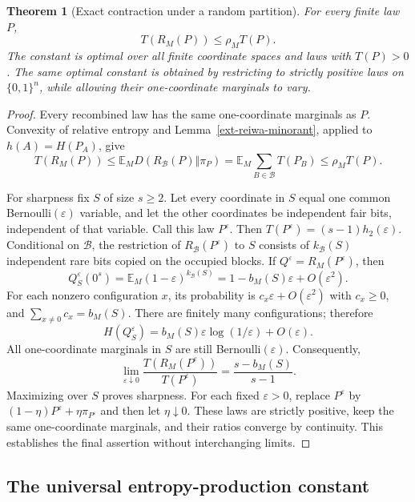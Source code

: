\documentclass[11pt,a4paper]{article}
\newtheorem{theorem}{Theorem}[section]
\theoremstyle{definition}\newtheorem{definition}[theorem]{Definition}
\theoremstyle{remark}\newtheorem{remark}[theorem]{Remark}
\numberwithin{equation}{section}
\begin{document}
\begin{theorem}[Exact contraction under a random partition]
\label{ext-reiwa-random-partition}
For every finite law $P$,
\begin{equation}\label{ext-reiwa-partition-contraction}
 T(R_M(P))\leq\rho_M T(P).
\end{equation}
The constant is optimal over all finite coordinate spaces and laws with
$T(P)>0$.  The same optimal constant is obtained by restricting to
strictly positive laws on $\{0,1\}^n$, while allowing their one-coordinate
marginals to vary.
\end{theorem}
\begin{proof}
Every recombined law has the same one-coordinate marginals as $P$.
Convexity of relative entropy and
Lemma~\ref{ext-reiwa-minorant}, applied to $h(A)=H(P_A)$, give
\[
 T(R_M(P))\leq\mathbb E_M D(R_{\mathcal B}(P)\Vert\pi_P)
 =\mathbb E_M\sum_{B\in\mathcal B}T(P_B)\leq\rho_M T(P).
\]

For sharpness fix $S$ of size $s\geq2$.  Let every coordinate in $S$
equal one common Bernoulli$(\varepsilon)$ variable, and let the other
coordinates be independent fair bits, independent of that variable.
Call this law $P^\varepsilon$.  Then
$T(P^\varepsilon)=(s-1)h_2(\varepsilon)$.
Conditional on $\mathcal B$, the restriction of $R_{\mathcal B}(P^\varepsilon)$
to $S$ consists of $k_{\mathcal B}(S)$ independent rare bits copied on
the occupied blocks.  If $Q^\varepsilon=R_M(P^\varepsilon)$, then
\[
 Q^\varepsilon_S(0^s)
 =\mathbb E_M(1-\varepsilon)^{k_{\mathcal B}(S)}
 =1-b_M(S)\varepsilon+O(\varepsilon^2).
\]
For each nonzero configuration $x$, its probability is
$c_x\varepsilon+O(\varepsilon^2)$ with $c_x\geq0$, and
$\sum_{x\ne0}c_x=b_M(S)$.  There are finitely many configurations;
therefore
\[
 H(Q^\varepsilon_S)
 =b_M(S)\varepsilon\log(1/\varepsilon)+O(\varepsilon).
\]
All one-coordinate marginals in $S$ are still Bernoulli$(\varepsilon)$.
Consequently,
\[
 \lim_{\varepsilon\downarrow0}
 \frac{T(R_M(P^\varepsilon))}{T(P^\varepsilon)}
 =\frac{s-b_M(S)}{s-1}.
\]
Maximizing over $S$ proves sharpness.  For each fixed $\varepsilon>0$,
replace $P^\varepsilon$ by
$(1-\eta)P^\varepsilon+\eta\pi_{P^\varepsilon}$ and then let
$\eta\downarrow0$.  These laws are strictly positive, keep the same
one-coordinate marginals, and their ratios converge by continuity.
This establishes the final assertion without interchanging limits.
\end{proof}

\subsection{The universal entropy-production constant}
\end{document}
